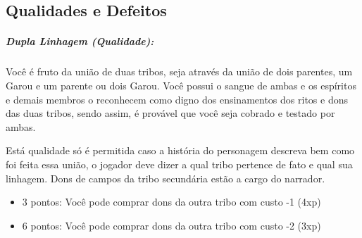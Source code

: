 \subsection{\bf Qualidades e Defeitos}

\subparagraph{\bf Dupla Linhagem (Qualidade):}
Você é fruto da união de duas tribos, seja através da união de dois parentes, um Garou e um parente ou dois Garou. Você possui o sangue de ambas e os espíritos e demais membros o reconhecem como digno dos ensinamentos dos ritos e dons das duas tribos, sendo assim, é provável que você seja cobrado e testado por ambas. 

Está qualidade só é permitida caso a história do personagem descreva bem como foi feita essa união, o jogador deve dizer a qual tribo pertence de fato e qual sua linhagem. Dons de campos da tribo secundária estão a cargo do narrador.
\begin{itemize}[noitemsep]
\item 3 pontos: Você pode comprar dons da outra tribo com custo -1 (4xp)
\item 6 pontos: Você pode comprar dons da outra tribo com custo -2 (3xp)
\end{itemize}